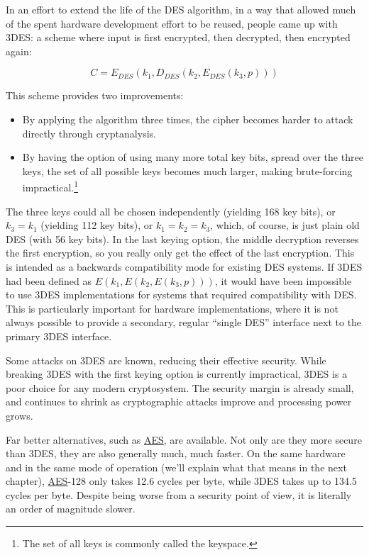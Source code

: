 \documentclass[11pt,ebook,table,dvipsnames]{memoir}
\begin{document}
In an effort to extend the life of the DES algorithm, in a way that
allowed much of the spent hardware development effort to be reused,
people came up with 3DES: a scheme where input is first encrypted,
then decrypted, then encrypted again:

\begin{equation}
C = E_{DES}(k_1, D_{DES}(k_2, E_{DES}(k_3, p)))
\end{equation}

This scheme provides two improvements:

\begin{itemize}
\item By applying the algorithm three times, the cipher becomes harder to
attack directly through cryptanalysis.
\item By having the option of using many more total key bits, spread over
the three keys, the set of all possible keys becomes much larger,
making brute-forcing impractical.\footnote{The set of all keys is
   commonly called the keyspace.}
\end{itemize}

The three keys could all be chosen independently (yielding 168 key
bits), or $k_3 = k_1$ (yielding 112 key bits), or $k_1 = k_2 = k_3$,
which, of course, is just plain old DES (with 56 key bits). In the
last keying option, the middle decryption reverses the first
encryption, so you really only get the effect of the last encryption.
This is intended as a backwards compatibility mode for existing DES
systems. If 3DES had been defined as $E(k_1, E(k_2, E(k_3, p)))$, it
would have been impossible to use 3DES implementations for systems
that required compatibility with DES. This is particularly important
for hardware implementations, where it is not always possible to
provide a secondary, regular \enquote{single DES} interface next to the
primary 3DES interface.

Some attacks on 3DES are known, reducing their effective security.
While breaking 3DES with the first keying option is currently
impractical, 3DES is a poor choice for any modern cryptosystem. The
security margin is already small, and continues to shrink as
cryptographic attacks improve and processing power grows.

Far better alternatives, such as \hyperref[AES]{AES}, are available. Not only are they
more secure than 3DES, they are also generally much, much faster. On
the same hardware and in the same \gls{mode of operation} (we'll
explain what that means in the next chapter), \hyperref[AES]{AES}-128 only takes 12.6
cycles per byte, while 3DES takes up to 134.5 cycles per byte.
\cite{cryptopp:bench} Despite being worse from a security point of
view, it is literally an order of magnitude slower.
\end{document}
